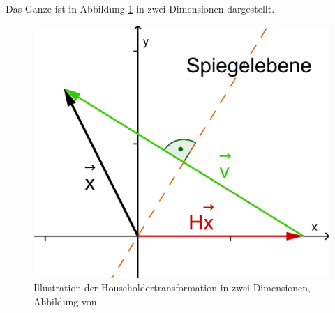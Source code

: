 Das Ganze ist in Abbildung \ref{francis:abb:householder_transform} in zwei Dimensionen dargestellt.
\begin{figure}
	\begin{center}
		\includegraphics[scale=0.1]{papers/francis/images/Householdertransformation.png}
		\caption{Illustration der Householdertransformation in zwei Dimensionen, Abbildung von \cite{francis:householder}}
		\label{francis:abb:householder_transform}
	\end{center}
\end{figure}
